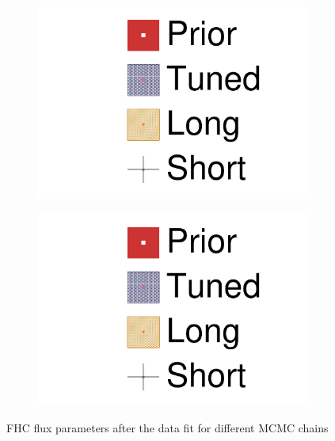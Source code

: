 \begin{figure}[h]
\begin{subfigure}[t]{0.24\textwidth}
		\includegraphics[width=\textwidth, trim={0mm 0mm 0mm 0mm}, clip,page=12]{figures/mach3/data/2017b_NewData_NewDet_UpdXsecStep_2Xsec_4Det_5Flux_0_2017b_June_NewDet_merge_2017b_NewDet_June_Long_0}
	\end{subfigure}
	\begin{subfigure}[t]{0.24\textwidth}
		\includegraphics[width=\textwidth, trim={0mm 0mm 0mm 0mm}, clip,page=13]{figures/mach3/data/2017b_NewData_NewDet_UpdXsecStep_2Xsec_4Det_5Flux_0_2017b_June_NewDet_merge_2017b_NewDet_June_Long_0}
	\end{subfigure}
	\caption{FHC flux parameters after the data fit for different MCMC chains}
	\label{fig:flux_data_fhc}
\end{figure}

